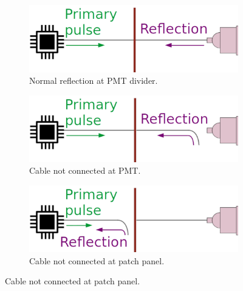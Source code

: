 \begin{figure}[h]
  \centering
  \begin{subfigure}[b]{0.3\textwidth}
    \centering
    \includegraphics[width=1.1\textwidth]{commissioning/fig_commissioning/scheme_reflecto.pdf}
    \captionsetup{justification=centering}
    \caption{Normal reflection at PMT divider.
      \label{subfig:reflecto_normal}}

  \end{subfigure}
  \hfill
  \begin{subfigure}[b]{0.3\textwidth}
    \centering
    \includegraphics[width=1.1\textwidth]{commissioning/fig_commissioning/scheme_reflecto_1.pdf}
    \captionsetup{justification=centering}
    \caption{Cable not connected at PMT.
      \label{subfig:reflecto_pmt}}

  \end{subfigure}
  \hfill
  \begin{subfigure}[b]{0.3\textwidth}
    \centering
    \includegraphics[width=1.1\textwidth]{commissioning/fig_commissioning/scheme_reflecto_2.pdf}
    \captionsetup{justification=centering}
    \caption{Cable not connected at patch panel.
      \label{subfig:reflecto_pp}}


\end{subfigure}
\end{figure}
